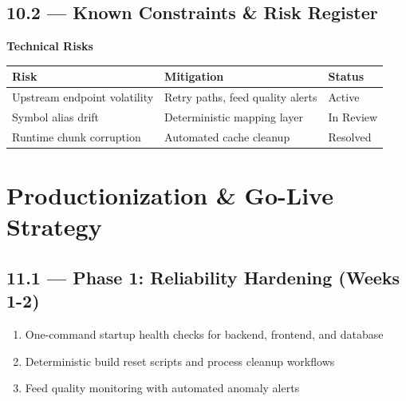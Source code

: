 \documentclass[11pt,a4paper]{article}
\begin{document}
\subsection{10.2 — Known Constraints \& Risk Register}

\begin{tcolorbox}[colback=mn-warning!15, colframe=mn-warning, arc=1mm, boxsep=10pt]
\small\textbf{Technical Risks}

\begin{table}[h]
\centering
\begin{tabular}{|p{2.3cm}|p{2.8cm}|p{1.2cm}|}
\hline
\rowcolor{mn-warning!25}
\textbf{Risk} & \textbf{Mitigation} & \textbf{Status} \\
\hline
Upstream endpoint volatility & Retry paths, feed quality alerts & \textcolor{mn-warning}{Active} \\
\hline
Symbol alias drift & Deterministic mapping layer & \textcolor{mn-warning}{In Review} \\
\hline
Runtime chunk corruption & Automated cache cleanup & \textcolor{mn-success}{Resolved} \\
\hline
\end{tabular}
\end{table}

\end{tcolorbox}

\section{Productionization \& Go-Live Strategy}

\subsection{11.1 — Phase 1: Reliability Hardening (Weeks 1-2)}

\begin{enumerate}[label={\textcolor{mn-blue}{\textbf{1.\arabic*}}}]
    \item One-command startup health checks for backend, frontend, and database
    \item Deterministic build reset scripts and process cleanup workflows
    \item Feed quality monitoring with automated anomaly alerts
\end{enumerate}
\end{document}
